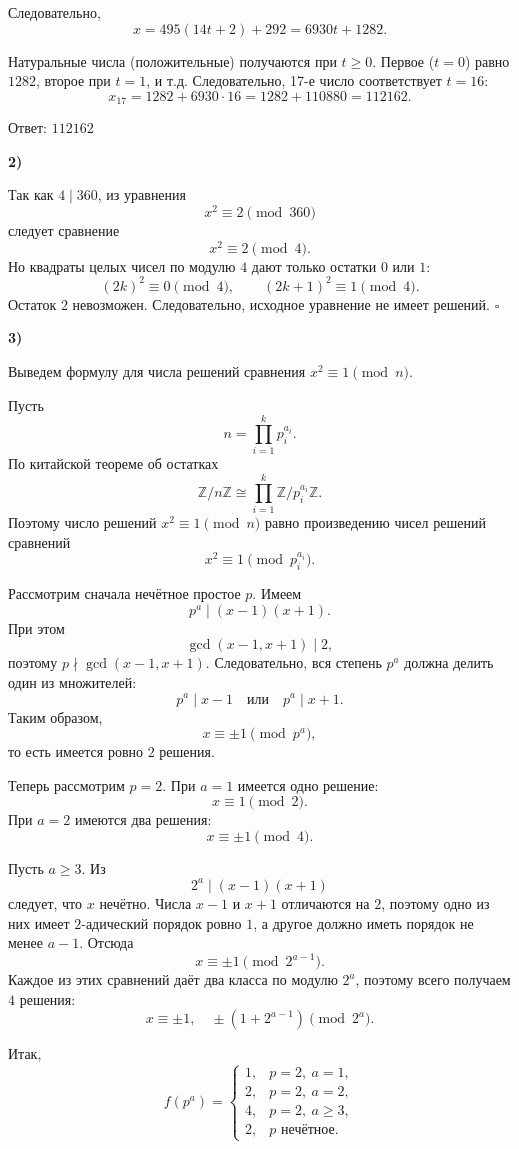 \documentclass[12pt,a4paper]{article}
\newcommand{\soli}[1]{%
  \par\vspace{0.15\baselineskip}%
  \noindent\textbf{#1)}\ %
  \ignorespaces                     %
}
\begin{document}
Следовательно,
\[
x=495(14t+2)+292=6930t+1282.
\]

Натуральные числа (положительные) получаются при $t\ge 0$. Первое ($t=0$) равно $1282$, второе при $t=1$, и т.д.  
Следовательно, 17-е число соответствует $t=16$:
\[
x_{17}=1282+6930\cdot 16=1282+110880=112162.
\]

Ответ: $\boxed{112162}$


\soli{2}
Так как $4 \mid 360$, из уравнения
\[
x^2 \equiv 2 \pmod{360}
\]
следует сравнение
\[
x^2 \equiv 2 \pmod{4}.
\]
Но квадраты целых чисел по модулю $4$ дают только остатки $0$ или $1$:
\[
(2k)^2 \equiv 0 \pmod{4}, \qquad (2k+1)^2 \equiv 1 \pmod{4}.
\]
Остаток $2$ невозможен. Следовательно, исходное уравнение не имеет решений. \hfill $\square$

\soli{3}
Выведем формулу для числа решений сравнения \(x^2\equiv1\pmod n\).

Пусть
\[
n=\prod_{i=1}^k p_i^{a_i}.
\]
По китайской теореме об остатках
\[
\mathbb Z/n\mathbb Z\cong
\prod_{i=1}^k\mathbb Z/p_i^{a_i}\mathbb Z.
\]
Поэтому число решений \(x^2\equiv1\pmod n\) равно произведению чисел решений сравнений
\[
x^2\equiv1\pmod{p_i^{a_i}}.
\]

Рассмотрим сначала нечётное простое \(p\). Имеем
\[
p^a\mid(x-1)(x+1).
\]
При этом
\[
\gcd(x-1,x+1)\mid2,
\]
поэтому \(p\nmid\gcd(x-1,x+1)\). Следовательно, вся степень \(p^a\) должна делить один из множителей:
\[
p^a\mid x-1
\quad\text{или}\quad
p^a\mid x+1.
\]
Таким образом,
\[
x\equiv\pm1\pmod{p^a},
\]
то есть имеется ровно \(2\) решения.

Теперь рассмотрим \(p=2\). При \(a=1\) имеется одно решение:
\[
x\equiv1\pmod2.
\]
При \(a=2\) имеются два решения:
\[
x\equiv\pm1\pmod4.
\]

Пусть \(a\ge3\). Из
\[
2^a\mid(x-1)(x+1)
\]
следует, что \(x\) нечётно. Числа \(x-1\) и \(x+1\) отличаются на \(2\), поэтому одно из них имеет \(2\)-адический порядок ровно \(1\), а другое должно иметь порядок не менее \(a-1\). Отсюда
\[
x\equiv\pm1\pmod{2^{a-1}}.
\]
Каждое из этих сравнений даёт два класса по модулю \(2^a\), поэтому всего получаем \(4\) решения:
\[
x\equiv\pm1,\quad
\pm(1+2^{a-1})\pmod{2^a}.
\]

Итак,
\[
f(p^a)=
\begin{cases}
1,&p=2,\ a=1,\\
2,&p=2,\ a=2,\\
4,&p=2,\ a\ge3,\\
2,&p\text{ нечётное}.
\end{cases}
\]
\end{document}
